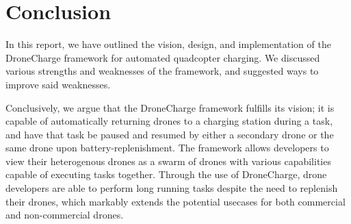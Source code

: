 \section{Conclusion}
In this report, we have outlined the vision, design, and implementation of the DroneCharge framework for automated quadcopter charging. We discussed various strengths and weaknesses of the framework, and 
suggested ways to improve said weaknesses.

Conclusively, we argue that the DroneCharge framework fulfills its vision; it is capable of automatically returning drones to a charging station during a task, and have that task be paused and resumed by either a secondary drone or the same drone upon battery-replenishment. The framework allows developers to view their heterogenous drones as a swarm of drones with various capabilities capable of executing tasks together. Through the use of DroneCharge, drone developers are able to perform long running tasks despite the need to replenish their drones, which markably extends the potential usecases for both commercial and non-commercial drones.